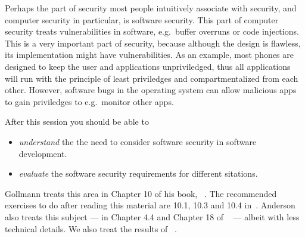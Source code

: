 Perhaps the part of security most people intuitively associate with security, 
and computer security in particular, is software security.
This part of computer security treats vulnerabilities in software, e.g.\ buffer 
overruns or code injections.
This is a very important part of security, because although the design is 
flawless, its implementation might have vulnerabilities.
As an example, most phones are designed to keep the user and applications 
unpriviledged, thus all applications will run with the principle of least 
priviledges and compartmentalized from each other.
However, software bugs in the operating system can allow malicious apps to gain
priviledges to e.g.\ monitor other apps.

After this session you should be able to
\begin{itemize}
  \item \emph{understand} the the need to consider software security in 
    software development.
  \item \emph{evaluate} the software security requirements for different 
    sitations.
\end{itemize}

Gollmann treats this area in Chapter 10 of his book, 
~\cite{Gollmann2011cs}.
The recommended exercises to do after reading this material are 10.1, 10.3 and 
10.4 in~\cite{Gollmann2011cs}.
Anderson also treats this subject --- in Chapter 4.4 and Chapter 18 of 
~\cite{Anderson2008sea} --- albeit with less 
technical details.
We also treat the results of ~\cite{BSIMMFindings}.
